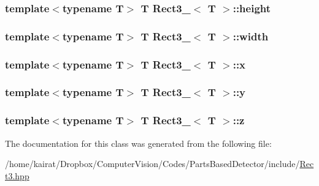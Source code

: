 \subsubsection[{height}]{\setlength{\rightskip}{0pt plus 5cm}template$<$typename T$>$ T {\bf Rect3\+\_\+}$<$ T $>$\+::height}\label{classRect3___a4f10fdcf15fe8cdb6b01a9b90d56ebe5}
\hypertarget{classRect3___a780cbb24a81d6bbfff26c2ac6660beb8}{}
\subsubsection[{width}]{\setlength{\rightskip}{0pt plus 5cm}template$<$typename T$>$ T {\bf Rect3\+\_\+}$<$ T $>$\+::width}\label{classRect3___a780cbb24a81d6bbfff26c2ac6660beb8}
\hypertarget{classRect3___a035f211c0c365a9dbd15436cb5448e31}{}
\subsubsection[{x}]{\setlength{\rightskip}{0pt plus 5cm}template$<$typename T$>$ T {\bf Rect3\+\_\+}$<$ T $>$\+::x}\label{classRect3___a035f211c0c365a9dbd15436cb5448e31}
\hypertarget{classRect3___ab2c61e4e318bc064eb8bb707b699cbb6}{}
\subsubsection[{y}]{\setlength{\rightskip}{0pt plus 5cm}template$<$typename T$>$ T {\bf Rect3\+\_\+}$<$ T $>$\+::y}\label{classRect3___ab2c61e4e318bc064eb8bb707b699cbb6}
\hypertarget{classRect3___a99bae7d4f2bf0af6a3ffbfb0fa752b9e}{}
\subsubsection[{z}]{\setlength{\rightskip}{0pt plus 5cm}template$<$typename T$>$ T {\bf Rect3\+\_\+}$<$ T $>$\+::z}\label{classRect3___a99bae7d4f2bf0af6a3ffbfb0fa752b9e}


The documentation for this class was generated from the following file\+:\begin{DoxyCompactItemize}
\item 
/home/kairat/\+Dropbox/\+Computer\+Vision/\+Codes/\+Parts\+Based\+Detector/include/\hyperlink{Rect3_8hpp}{Rect3.\+hpp}\end{DoxyCompactItemize}
